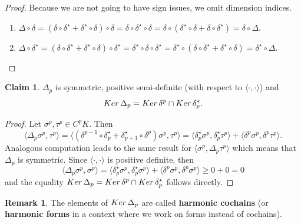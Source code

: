 \documentclass{elsarticle}
\theoremstyle{definition}
\newtheorem{claim}[theorem]{Claim}
\newtheorem{remark}[theorem]{Remark}
\newcommand{\inner}[2]{\langle#1,#2\rangle}
\newcommand{\Ker}{\mathop{\rm Ker}\nolimits}
\begin{document}
\begin{proof}
  Because we are not going to have sign issues, we omit dimension indices.
  \begin{enumerate}
    \item 
      $\Delta \circ \delta 
        = (\delta \circ \delta^\star + \delta^\star \circ \delta) \circ \delta 
        = \delta \circ \delta^\star \circ \delta 
        = \delta \circ (\delta^\star \circ \delta + \delta \circ \delta^\star) 
        = \delta \circ \Delta$.
    \item 
      $\Delta \circ \delta^\star 
        = (\delta \circ \delta^\star + \delta^\star \circ \delta) \circ \delta^\star 
        = \delta^\star \circ \delta \circ \delta^\star 
        = \delta^\star \circ (\delta \circ \delta^\star + \delta^\star \circ \delta) 
       = \delta^\star \circ \Delta$. \qedhere
  \end{enumerate}
\end{proof}
\begin{claim}
  $\Delta_p$ is symmetric, positive semi-definite
  (with respect to $\inner{\cdot}{\cdot}$) and 
  \begin{equation}
    \Ker \Delta_p = \Ker \delta^p \cap \Ker \delta^\star_p.
  \end{equation}
\end{claim}
\begin{proof}
  Let $\sigma^p, \tau^p \in C^p K$. Then
  \begin{equation}
    \inner{\Delta_p \sigma^p}{\tau^p} 
      =   \inner{(\delta^{p - 1} \circ \delta^\star_p
        + \delta^\star_{p + 1} \circ \delta^p) \sigma^p}{\tau^p} 
      =   \inner{\delta^\star_p \sigma^p}{\delta^\star_p \tau^p} 
        + \inner{\delta^p \sigma^p}{\delta^p \tau^p}.
  \end{equation}
  Analogous computation leads to the same result for $\inner{\sigma^p}{\Delta_p \tau^p}$ which means that $\Delta_p$ is symmetric. Since $\inner{\cdot}{\cdot}$ is positive definite, then 
  \begin{equation}
    \inner{\Delta_p \sigma^p}{\sigma^p}
      =   \inner{\delta^\star_p \sigma^p}{\delta^\star_p \sigma^p}
        + \inner{\delta^p \sigma^p}{\delta^p \sigma^p}
      \geq 0 + 0 
      = 0
  \end{equation}
  and the equality $\Ker \Delta_p = \Ker \delta^p \cap \Ker \delta^\star_p$ follows directly.
\end{proof}
\begin{remark}
  The elements of $\Ker \Delta_p$ are called \textbf{harmonic cochains} (or \textbf{harmonic forms} in a context where we work on forms instead of cochains).
\end{remark}
\end{document}
